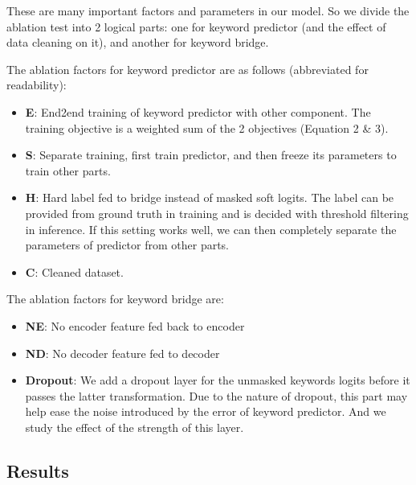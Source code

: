 These are many important factors and parameters in our model. So we divide the ablation test into 2 logical parts: one for keyword predictor (and the effect of data cleaning on it), and another for keyword bridge. 

The ablation factors for keyword predictor are as follows (abbreviated for readability):
\begin{itemize}
  \item \textbf{E}: End2end training of keyword predictor with other component. The training objective is a weighted sum of the 2 objectives (Equation 2 \& 3).
  \item \textbf{S}: Separate training, first train predictor, and then freeze its parameters to train other parts. 
  \item \textbf{H}: Hard label fed to bridge instead of masked soft logits. The label can be provided from ground truth in training and is decided with threshold filtering in inference. If this setting works well, we can then completely separate the parameters of predictor from other parts.
  \item \textbf{C}: Cleaned dataset.
\end{itemize}


The ablation factors for keyword bridge are:
\begin{itemize}
  \item \textbf{NE}: No encoder feature fed back to encoder
  \item \textbf{ND}: No decoder feature fed to decoder
  \item \textbf{Dropout}: We add a dropout layer for the unmasked keywords logits before it passes the latter transformation. Due to the nature of dropout, this part may help ease the noise introduced by the error of keyword predictor. And we study the effect of the strength of this layer.
\end{itemize}

\subsection{Results}

